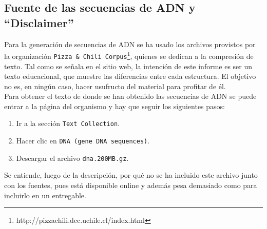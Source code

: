 \documentclass[12pt,letterpaper]{report}
\begin{document}
\subsection{Fuente de las secuencias de ADN y ``Disclaimer''}
\label{subsec:fuente_textos}

Para la generación de secuencias de ADN se ha usado los archivos provistos por la organización \texttt{Pizza \& Chili Corpus}\footnote{http://pizzachili.dcc.uchile.cl/index.html}, quienes se dedican a la compresión de texto. Tal como se señala en el sitio web, la intención de este informe es ser un texto educacional, que muestre las diferencias entre cada estructura. El objetivo no es, en ningún caso, hacer usufructo del material para profitar de él.\\

Para obtener el texto de donde se han obtenido las secuencias de ADN se puede entrar a la página del organismo y hay que seguir los siguientes pasos:
\begin{enumerate}
\item Ir a la sección \texttt{Text Collection}.
\item Hacer clic en \texttt{DNA (gene DNA sequences)}.
\item Descargar el archivo \texttt{dna.200MB.gz}.
\end{enumerate}

Se entiende, luego de la descripción, por qué no se ha incluido este archivo junto con los fuentes, pues está disponible online y además pesa demasiado como para incluirlo en un entregable.
\end{document}
